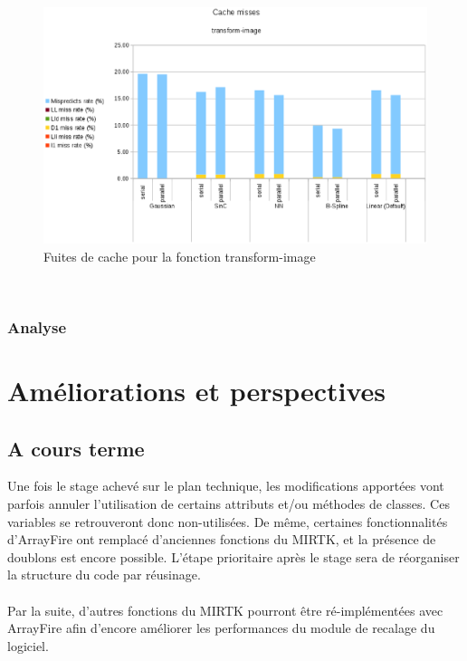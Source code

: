\documentclass[10pt]{report}
\begin{document}
			\begin{figure}[h!]
				\begin{center}
					\includegraphics[width=15cm]{Reports/figures/cache_misses_transform_image.eps}
				\end{center}	
				\caption{Fuites de cache pour la fonction transform-image}
				\label{Fuites de cache pour la fonction transform-image}
			\end{figure}~\par

	\subsection{Analyse}
	
\chapter{Améliorations et perspectives}
	\section{A cours terme}
	Une fois le stage achevé sur le plan technique, les modifications apportées vont parfois annuler l'utilisation de certains attributs et/ou méthodes de classes. Ces variables se retrouveront donc non-utilisées. De même, certaines fonctionnalités d'ArrayFire ont remplacé d'anciennes fonctions du MIRTK, et la présence de doublons est encore possible. L'étape prioritaire après le stage sera de réorganiser la structure du code par réusinage.\\
	\\Par la suite, d'autres fonctions du MIRTK pourront être ré-implémentées avec ArrayFire afin d'encore améliorer les performances du module de recalage du logiciel.
\end{document}
